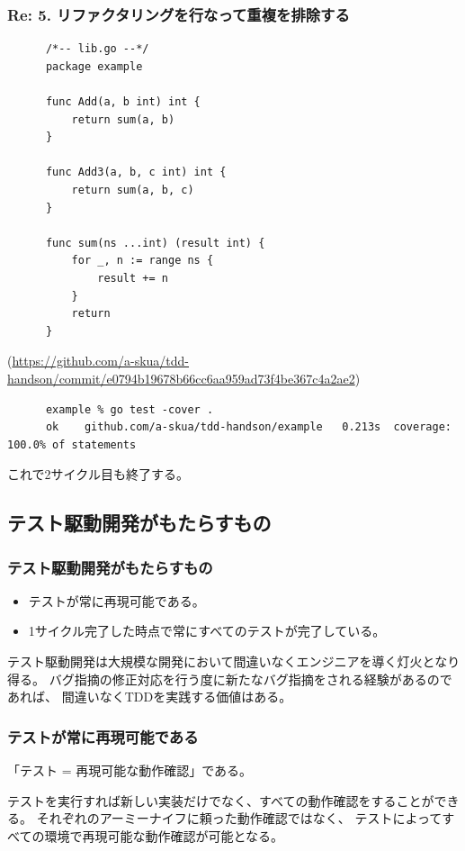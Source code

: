 \documentclass[aspectratio=169]{beamer}
\begin{document}
\begin{frame}[fragile]\frametitle{Re: 5. リファクタリングを行なって重複を排除する}
  {
    \scriptsize
    \begin{verbatim}
      /*-- lib.go --*/
      package example

      func Add(a, b int) int {
          return sum(a, b)
      }

      func Add3(a, b, c int) int {
          return sum(a, b, c)
      }

      func sum(ns ...int) (result int) {
          for _, n := range ns {
              result += n
          }
          return
      }
    \end{verbatim}

    {\color{gray} (\url{https://github.com/a-skua/tdd-handson/commit/e0794b19678b66cc6aa959ad73f4be367c4a2ae2})}
    \color{gray}
    \begin{verbatim}
      example % go test -cover .
      ok  	github.com/a-skua/tdd-handson/example	0.213s	coverage: 100.0% of statements
    \end{verbatim}
  }
  これで2サイクル目も終了する。
\end{frame}

\subsection{テスト駆動開発がもたらすもの}
\begin{frame}\frametitle{テスト駆動開発がもたらすもの}
  \begin{itemize}
    \item {\color{blue} テストが常に再現可能である。}
    \item {\color{blue} 1サイクル完了した時点で常にすべてのテストが完了している。}
  \end{itemize}

  テスト駆動開発は大規模な開発において間違いなくエンジニアを導く灯火となり得る。
  \color{gray} 
  バグ指摘の修正対応を行う度に新たなバグ指摘をされる経験があるのであれば、
  間違いなくTDDを実践する価値はある。
\end{frame}

\begin{frame}\frametitle{テストが常に再現可能である}
  {\color{blue}「テスト = 再現可能な動作確認」}である。

  テストを実行すれば新しい実装だけでなく、すべての動作確認をすることができる。
  それぞれのアーミーナイフに頼った動作確認ではなく、
  {\color{blue} テストによってすべての環境で再現可能な動作確認が可能となる。}
\end{frame}
\end{document}
